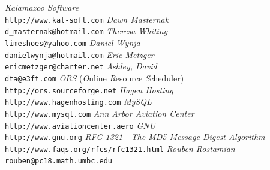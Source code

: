 \documentclass[letterpaper,10pt,titlepage]{article}
\begin{document}
\begin{thebibliography}{000}
   \emph{Kalamazoo Software}\\
   \texttt{http://www.kal-soft.com}
   \emph{Dawn Masternak}\\
   \texttt{d\_masternak@hotmail.com}
   \emph{Theresa Whiting}\\
   \texttt{limeshoes@yahoo.com}
   \emph{Daniel Wynja}\\
   \texttt{danielwynja@hotmail.com}
   \emph{Eric Metzger}\\
   \texttt{ericmetzger@charter.net}
   \emph{Ashley, David}\\
   \texttt{dta@e3ft.com}
   \emph{ORS} (\emph{O}nline \emph{R}esource \emph{S}cheduler)\\
   \texttt{http://ors.sourceforge.net}
   \emph{Hagen Hosting}\\
   \texttt{http://www.hagenhosting.com}
   \emph{MySQL} \\
   \texttt{http://www.mysql.com}
   \emph{Ann Arbor Aviation Center} \\
   \texttt{http://www.aviationcenter.aero}
   \emph{GNU} \\
   \texttt{http://www.gnu.org}
   \emph{RFC 1321---The MD5 Message-Digest Algorithm} \\
   \texttt{http://www.faqs.org/rfcs/rfc1321.html}
   \emph{Rouben Rostamian}\\
   \texttt{rouben@pc18.math.umbc.edu}
\end{thebibliography}

\clearpage{}
\printindex
\end{document}

